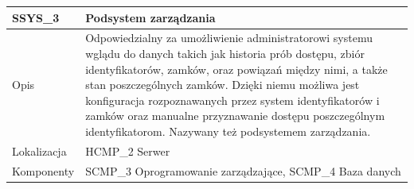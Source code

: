 \begin{table}
\begin{subtable}[c]{\textwidth}
                    \end{subtable}
                \quad%
                    \begin{subtable}[c]{\textwidth}
                        \centering
                        \begin{tabular}{|p{2cm}|p{12cm}|}
                            \hline SSYS\_3      & \textbf{Podsystem zarządzania} \\
                            \hline \cellcolor[gray]{0.8} Opis         & Odpowiedzialny za umożliwienie administratorowi systemu wglądu do danych takich jak historia prób dostępu, zbiór identyfikatorów, zamków, oraz powiązań między nimi, a także stan poszczególnych zamków. Dzięki niemu możliwa jest konfiguracja rozpoznawanych przez system identyfikatorów i zamków oraz manualne przyznawanie dostępu poszczególnym identyfikatorom. Nazywany też podsystemem zarządzania. \\
                            \hline \cellcolor[gray]{0.8} Lokalizacja  & HCMP\_2 Serwer    \\
                            \hline \cellcolor[gray]{0.8} Komponenty   & SCMP\_3 Oprogramowanie zarządzające, SCMP\_4 Baza danych \\
                            \hline
                        \end{tabular}
                        \label{tbl:ssys3}      
                    \end{subtable}                 
                    \label{tbl:subsystems}
                \end{table}

